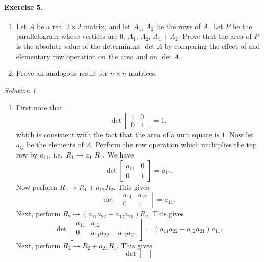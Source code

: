 \documentclass[11pt]{report}
\theoremstyle{remark}
\newtheorem*{solution}{Solution}
\begin{document}
    \paragraph{Exercise 5.} \begin{enumerate}
        \itemsep0em    
        \item Let $A$ be a real $2\times 2$ matrix, and let $A_1$, $A_2$ be the rows
        of $A$. Let $P$ be the parallelogram whose vertices are $0$, $A_1$, $A_2$,
        $A_1 + A_2$. Prove that the area of $P$ is the absolute value of the
        determinant $\det{A}$ by comparing the effect of and elementary row
        operation on the area and on $\det A$.
        \item Prove an analogous result for $n \times n$ matrices.
    \end{enumerate}
    \begin{solution} \mbox{}
        \begin{enumerate}
            \itemsep0em
            \item First note that \[
                \det \begin{bmatrix}
                    1 & 0 \\ 0 & 1
                \end{bmatrix} = 1,
            \] which is consistent with the fact that the area of a unit square is
            $1$. Now let $a_{ij}$ be the elements of $A$. Perform the row operation
            which multiplies the top row by $a_{11}$, i.e.\ $R_1 \to a_{11}R_1$. We
            have \[
                \det \begin{bmatrix}
                    a_{11} & 0 \\ 0 & 1
                \end{bmatrix} = a_{11}.
            \] Now perform $R_1 \to R_1 + a_{12}R_2$. This gives \[
                \det \begin{bmatrix}
                    a_{11} & a_{12} \\ 0 & 1
                \end{bmatrix} = a_{11}.
            \] Next, perform $R_2 \to (a_{11}a_{22} - a_{12}a_{21})R_2$. This gives
            \[
                \det \begin{bmatrix}
                    a_{11} & a_{12} \\ 0 & a_{11}a_{22} - a_{12}a_{21}
                \end{bmatrix} = (a_{11}a_{22} - a_{12}a_{21})a_{11}.
            \] Next, perform $R_2 \to R_2 + a_{21}R_1$. This gives \[
                \det \begin{bmatrix}

\end{bmatrix}\]
\end{enumerate}
\end{solution}
\end{document}
